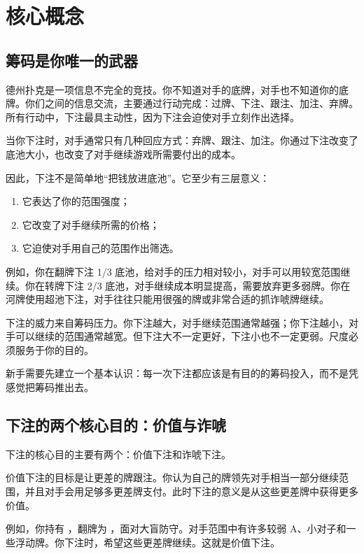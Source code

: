 \section{核心概念}

\subsection{筹码是你唯一的武器}

德州扑克是一项信息不完全的竞技。你不知道对手的底牌，对手也不知道你的底牌。你们之间的信息交流，主要通过行动完成：过牌、下注、跟注、加注、弃牌。所有行动中，下注最具主动性，因为下注会迫使对手立刻作出选择。

当你下注时，对手通常只有几种回应方式：弃牌、跟注、加注。你通过下注改变了底池大小，也改变了对手继续游戏所需要付出的成本。

因此，下注不是简单地“把钱放进底池”。它至少有三层意义：

\begin{enumerate}
\item 它表达了你的范围强度；
\item 它改变了对手继续所需的价格；
\item 它迫使对手用自己的范围作出筛选。
\end{enumerate}

例如，你在翻牌下注 1/3 底池，给对手的压力相对较小，对手可以用较宽范围继续。你在转牌下注 2/3 底池，对手继续成本明显提高，需要放弃更多弱牌。你在河牌使用超池下注，对手往往只能用很强的牌或非常合适的抓诈唬牌继续。

下注的威力来自筹码压力。你下注越大，对手继续范围通常越强；你下注越小，对手可以继续的范围通常越宽。但下注大不一定更好，下注小也不一定更弱。尺度必须服务于你的目的。

新手需要先建立一个基本认识：每一次下注都应该是有目的的筹码投入，而不是凭感觉把筹码推出去。

\subsection{下注的两个核心目的：价值与诈唬}

下注的核心目的主要有两个：价值下注和诈唬下注。

价值下注的目标是让更差的牌跟注。你认为自己的牌领先对手相当一部分继续范围，并且对手会用足够多更差牌支付。此时下注的意义是从这些更差牌中获得更多价值。

例如，你持有 ，翻牌为 ，面对大盲防守。对手范围中有许多较弱 A、小对子和一些浮动牌。你下注时，希望这些更差牌继续。这就是价值下注。


